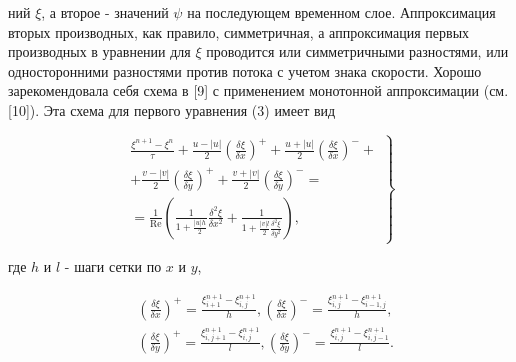 \documentclass[10pt]{article}
\begin{document}
ний $\xi$, а второе - значений $\psi$ на последующем временном слое. Аппроксимация вторых производных, как правило, симметричная, а аппроксимация первых производных в уравнении для $\xi$ проводится или симметричными разностями, или односторонними разностями против потока с учетом знака скорости. Хорошо зарекомендовала себя схема в [9] с применением монотонной аппроксимации (см. [10]). Эта схема для первого уравнения (3) имеет вид



\[

\left.\begin{array}{c}

\frac{\xi^{n+1}-\xi^{n}}{\tau}+\frac{u-|u|}{2}\left(\frac{\delta \xi}{\delta x}\right)^{+}+\frac{u+|u|}{2}\left(\frac{\delta \xi}{\delta x}\right)^{-}+ \\

+\frac{v-|v|}{2}\left(\frac{\delta \xi}{\delta y}\right)^{+}+\frac{v+|v|}{2}\left(\frac{\delta \xi}{\delta y}\right)^{-}= \\

=\frac{1}{\operatorname{Re}}\left(\frac{1}{1+\frac{|u| h}{2}} \frac{\delta^{2} \xi}{\delta x^{2}}+\frac{1}{1+\frac{|v| l}{2} \frac{\delta^{2} \xi}{\delta y^{2}}}\right),

\end{array}\right\}

\]



где $h$ и $l$ - шаги сетки по $x$ и $y$,



\[

\begin{aligned}

&\left(\frac{\delta \xi}{\delta x}\right)^{+}= \frac{\xi_{i+1}^{n+1}-\xi_{i, j}^{n+1}}{h},\left(\frac{\delta \xi}{\delta x}\right)^{-}=\frac{\xi_{i, j}^{n+1}-\xi_{i-1, j}^{n+1}}{h}, \\

&\left(\frac{\delta \xi}{\delta y}\right)^{+}=\frac{\xi_{i, j+1}^{n+1}-\xi_{i, j}^{n+1}}{l},\left(\frac{\delta \xi}{\delta y}\right)^{-}=\frac{\xi_{i, j}^{n+1}-\xi_{i, j-1}^{n+1}}{l} .

\end{aligned}

\]
\end{document}
